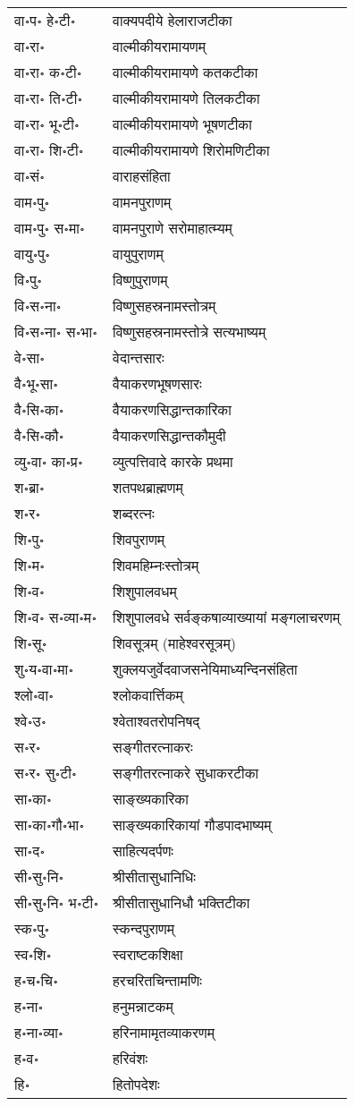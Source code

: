 \begin{longtable}{ll}
वा॰प॰ हे॰टी॰ & वाक्यपदीये हेलाराजटीका\\
वा॰रा॰ & वाल्मीकीयरामायणम्\\
वा॰रा॰ क॰टी॰ & वाल्मीकीयरामायणे कतकटीका\\
वा॰रा॰ ति॰टी॰ & वाल्मीकीयरामायणे तिलकटीका\\
वा॰रा॰ भू॰टी॰ & वाल्मीकीयरामायणे भूषणटीका\\
वा॰रा॰ शि॰टी॰ & वाल्मीकीयरामायणे शिरोमणिटीका\\
वा॰सं॰ & वाराहसंहिता\\
वाम॰पु॰ & वामनपुराणम्\\
वाम॰पु॰ स॰मा॰ & वामनपुराणे सरोमाहात्म्यम्\\
वायु॰पु॰ & वायुपुराणम्\\
वि॰पु॰ & विष्णुपुराणम्\\
वि॰स॰ना॰ & विष्णुसहस्रनामस्तोत्रम्\\
वि॰स॰ना॰ स॰भा॰ & विष्णुसहस्रनामस्तोत्रे सत्यभाष्यम्\\
वे॰सा॰ & वेदान्तसारः\\
वै॰भू॰सा॰ & वैयाकरणभूषणसारः\\
वै॰सि॰का॰ & वैयाकरणसिद्धान्तकारिका\\
वै॰सि॰कौ॰ & वैयाकरणसिद्धान्तकौमुदी\\
व्यु॰वा॰ का॰प्र॰ & व्युत्पत्तिवादे कारके प्रथमा\\
श॰ब्रा॰ & शतपथब्राह्मणम्\\
श॰र॰ & शब्दरत्नः\\
शि॰पु॰ & शिवपुराणम्\\
शि॰म॰ & शिवमहिम्नःस्तोत्रम्\\
शि॰व॰ & शिशुपालवधम्\\
शि॰व॰ स॰व्या॰म॰ & शिशुपालवधे सर्वङ्कषाव्याख्यायां मङ्गलाचरणम्\\
शि॰सू॰ & शिवसूत्रम् (माहेश्वरसूत्रम्)\\
शु॰य॰वा॰मा॰ & शुक्लयजुर्वेदवाजसनेयिमाध्यन्दिनसंहिता\\
श्लो॰वा॰ & श्लोकवार्त्तिकम्\\
श्वे॰उ॰ & श्वेताश्वतरोपनिषद्\\
स॰र॰ & सङ्गीतरत्नाकरः\\
स॰र॰ सु॰टी॰ & सङ्गीतरत्नाकरे सुधाकरटीका\\
सा॰का॰ & साङ्ख्यकारिका\\
सा॰का॰गौ॰भा॰ & साङ्ख्यकारिकायां गौडपादभाष्यम्\\
सा॰द॰ & साहित्यदर्पणः\\
सी॰सु॰नि॰ & श्रीसीतासुधानिधिः\\
सी॰सु॰नि॰ भ॰टी॰ & श्रीसीतासुधानिधौ भक्तिटीका\\
स्क॰पु॰ & स्कन्दपुराणम्\\
स्व॰शि॰ & स्वराष्टकशिक्षा\\
ह॰च॰चि॰ & हरचरितचिन्तामणिः\\
ह॰ना॰ & हनुमन्नाटकम्\\
ह॰ना॰व्या॰ & हरिनामामृतव्याकरणम्\\
ह॰व॰ & हरिवंशः\\
हि॰ & हितोपदेशः\\
\end{longtable}
